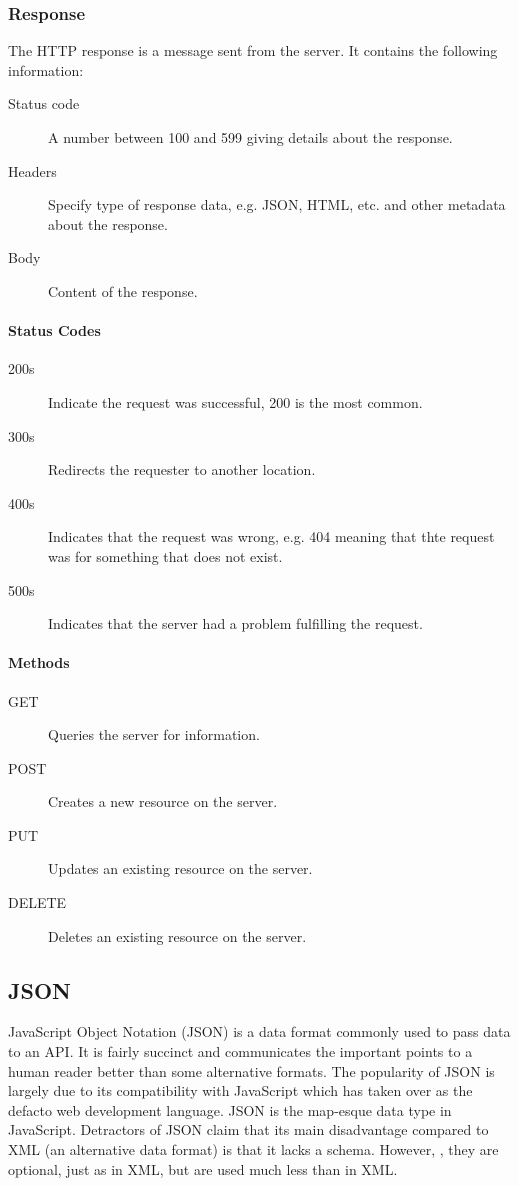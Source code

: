 \documentclass{csse4400}
\begin{document}
\subsubsection{Response}

The HTTP response is a message sent from the server.
It contains the following information:
\begin{description}
    \item[Status code] A number between 100 and 599 giving details about the response.
    \item[Headers] Specify type of response data, e.g. JSON, HTML, etc. and other metadata about the response.
    \item[Body] Content of the response.
\end{description}

\paragraph{Status Codes}
\begin{description}
    \item[200s] Indicate the request was successful, 200 is the most common.
    \item[300s] Redirects the requester to another location.
    \item[400s] Indicates that the request was wrong, e.g. 404 meaning that thte request was for something that does not exist.
    \item[500s] Indicates that the server had a problem fulfilling the request.
\end{description}

\paragraph{Methods}
\begin{description}
    \item[GET] Queries the server for information.
    \item[POST] Creates a new resource on the server.
    \item[PUT] Updates an existing resource on the server.
    \item[DELETE] Deletes an existing resource on the server.
\end{description}

\subsection{JSON}
JavaScript Object Notation (JSON) is a data format commonly used to pass data to an API.
It is fairly succinct and communicates the important points to a human reader better than some alternative formats.
The popularity of JSON is largely due to its compatibility with JavaScript which has taken over as the defacto web development language.
JSON is the map-esque data type in JavaScript.
Detractors of JSON claim that its main disadvantage compared to XML (an alternative data format) is that it lacks a schema.
However, ,
they are optional, just as in XML, but are used much less than in XML.
\end{document}
